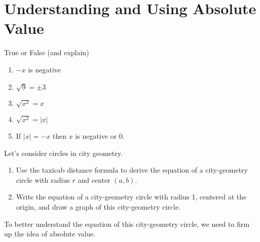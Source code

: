 \newpage

\section{Understanding and Using Absolute Value}

\begin{prob}
True or False (and explain)
\begin{enumerate}
\item $-x$ is negative
\item $\sqrt{9} = \pm 3$
\item $\sqrt{x^2} = x$
\item $\sqrt{x^2} = |x|$
\item If $|x| = -x$ then $x$ is negative or 0. 
\end{enumerate}
\end{prob}

\begin{prob}
Let's consider circles in city geometry.  
\begin{enumerate}
\item Use the taxicab distance formula to derive the equation of a city-geometry circle with radius $r$ and center $(a, b)$.  
\item Write the equation of a city-geometry circle with radius 1, centered at the origin, and draw a graph of this city-geometry circle.  
\end{enumerate}
\end{prob}

To better understand the equation of this city-geometry circle, we need to firm up the idea of absolute value.  

